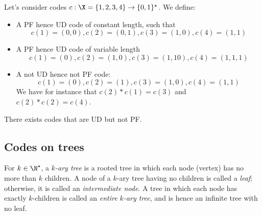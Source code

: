 \documentclass[toc]{../cs-classes/cs-classes}
\begin{document}
\begin{example}
    Let's consider codes $c: \X=\{1, 2, 3, 4\} \to \{0, 1\}^\star$. We define:
    \begin{itemize}
        \item A PF hence UD code of constant length, such that
        \begin{equation*}
            c(1) = (0, 0), c(2) = (0, 1), c(3) = (1, 0), c(4) = (1, 1)
        \end{equation*}
        \item A PF hence UD code of variable length
        \begin{equation*}
            c(1) = (0), c(2) = (1, 0), c(3) = (1, 1 0), c(4) = (1, 1, 1)
        \end{equation*}
        \item A not UD hence not PF code:
        \begin{equation*}
            c(1) = (0), c(2) = (1), c(3) = (1, 0), c(4) = (1, 1)
        \end{equation*}
        We have for instance that $c(2)*c(1)=c(3)$ and $c(2)*c(2)=c(4)$.
    \end{itemize}
\end{example}

\begin{property}
    There exists codes that are UD but not PF.
\end{property}

\subsection{Codes on trees}
\begin{definition}
    For $k\in\N^\star$, a \emph{$k$-ary tree} is a rooted tree in which each node (vertex) has no more than $k$ children. A node of a $k$-ary tree having no children is called a \emph{leaf}; otherwise, it is called an \emph{intermediate node}. A tree in which each node has exactly $k$-children is called an \emph{entire $k$-ary tree}, and is hence an infinite tree with no leaf.
\end{definition}
\end{document}
